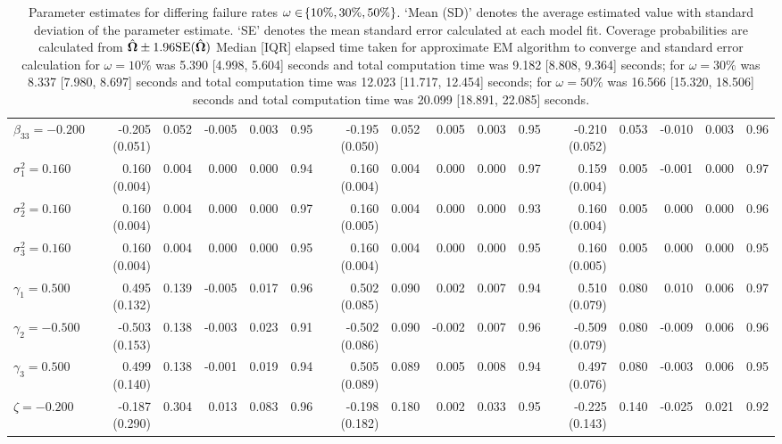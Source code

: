 \begin{landscape}
\begin{table}[ht]
\begin{tabular}{l|rrrrr:rrrrr:rrrrr}
  $\beta_{33} = -0.200$ & -0.205 (0.051) & 0.052 & -0.005 & 0.003 & 0.95 & -0.195 (0.050) & 0.052 &  0.005 & 0.003 & 0.95 & -0.210 (0.052) & 0.053 & -0.010 & 0.003 & 0.96 \\ 
  $\sigma^2_1 = 0.160$ &  0.160 (0.004) & 0.004 &  0.000 & 0.000 & 0.94 &  0.160 (0.004) & 0.004 &  0.000 & 0.000 & 0.97 &  0.159 (0.004) & 0.005 & -0.001 & 0.000 & 0.97 \\ 
  $\sigma^2_2 = 0.160$ &  0.160 (0.004) & 0.004 &  0.000 & 0.000 & 0.97 &  0.160 (0.005) & 0.004 &  0.000 & 0.000 & 0.93 &  0.160 (0.004) & 0.005 &  0.000 & 0.000 & 0.96 \\ 
  $\sigma^2_3 = 0.160$ &  0.160 (0.004) & 0.004 &  0.000 & 0.000 & 0.95 &  0.160 (0.004) & 0.004 &  0.000 & 0.000 & 0.95 &  0.160 (0.005) & 0.005 &  0.000 & 0.000 & 0.95 \\ 
  $\gamma_1 = 0.500$ &  0.495 (0.132) & 0.139 & -0.005 & 0.017 & 0.96 &  0.502 (0.085) & 0.090 &  0.002 & 0.007 & 0.94 &  0.510 (0.079) & 0.080 &  0.010 & 0.006 & 0.97 \\ 
  $\gamma_2 = -0.500$ & -0.503 (0.153) & 0.138 & -0.003 & 0.023 & 0.91 & -0.502 (0.086) & 0.090 & -0.002 & 0.007 & 0.96 & -0.509 (0.079) & 0.080 & -0.009 & 0.006 & 0.96 \\ 
  $\gamma_3 = 0.500$ &  0.499 (0.140) & 0.138 & -0.001 & 0.019 & 0.94 &  0.505 (0.089) & 0.089 &  0.005 & 0.008 & 0.94 &  0.497 (0.076) & 0.080 & -0.003 & 0.006 & 0.95 \\ 
  $\zeta = -0.200$ & -0.187 (0.290) & 0.304 &  0.013 & 0.083 & 0.96 & -0.198 (0.182) & 0.180 &  0.002 & 0.033 & 0.95 & -0.225 (0.143) & 0.140 & -0.025 & 0.021 & 0.92 \\ 
   \hline
\end{tabular}
\endgroup
\caption{Parameter estimates for differing failure rates $\omega\in\!\left\{10\%,30\%,50\%\right\}$. `Mean (SD)' denotes the average estimated value with standard deviation of the parameter estimate. `SE' denotes the mean standard error calculated at each model fit. Coverage probabilities are calculated from $\hat{\bm{\Omega}}\pm1.96\mathrm{SE}(\hat{\bm{\Omega}})$ Median [IQR] elapsed time taken for approximate EM algorithm to converge and standard error calculation for $\omega=10\%$ was 5.390 [4.998, 5.604] seconds and total computation time was 9.182 [8.808, 9.364] seconds; for $\omega=30\%$ was 8.337 [7.980, 8.697] seconds and total computation time was 12.023 [11.717, 12.454] seconds; for $\omega=50\%$ was 16.566 [15.320, 18.506] seconds and total computation time was 20.099 [18.891, 22.085] seconds.} 
\end{table}
\vfill
\lscapepageno
\end{landscape}
\restoregeometry
\clearpage

